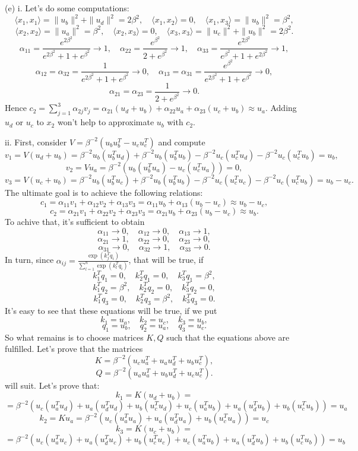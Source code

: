 \documentclass[12pt]{article}
\begin{document}
\noindent (e) i. Let's do some computations:
$$
\langle x_1, x_1\rangle = \|u_b\|^2 + \|u_d\|^2 = 2\beta^2, \quad
\langle x_1, x_2\rangle = 0, \quad
\langle x_1, x_3\rangle = \|u_b\|^2 = \beta^2,
$$
$$
\langle x_2, x_2\rangle = \|u_a\|^2 = \beta^2, \quad
\langle x_2, x_3\rangle = 0, \quad
\langle x_3, x_3\rangle = \|u_c\|^2 + \|u_b\|^2 = 2\beta^2.
$$
$$
\alpha_{11} = \frac{e^{2\beta^2}}{e^{2\beta^2} + 1 + e^{\beta^2}} \to 1,\quad
\alpha_{22} = \frac{e^{\beta^2}}{2 + e^{\beta^2}} \to 1, \quad
\alpha_{33} = \frac{e^{2\beta^2}}{e^{\beta^2} + 1 + e^{2\beta^2}} \to 1,
$$
$$
\alpha_{12} = \alpha_{32} = \frac{1}{e^{2\beta^2} + 1 + e^{\beta^2}}\to 0,\quad
\alpha_{13} = \alpha_{31} = \frac{e^{\beta^2}}{e^{2\beta^2} + 1 + e^{\beta^2}}\to 0,
$$
$$
\alpha_{21} = \alpha_{23} = \frac{1}{2 + e^{\beta^2}}\to 0.
$$
Hence $c_2 = \sum_{j=1}^3 \alpha_{2j}v_j = \alpha_{21}(u_d + u_b) + \alpha_{22} u_a + \alpha_{23}(u_c + u_b) \approx u_a$. Adding $u_d$ or $u_c$ to $x_2$ won't help to approximate $u_b$ with $c_2$.

ii. First, consider $V = \beta^{-2}(u_bu_b^T - u_cu_c^T)$ and compute
$$
v_1 = V(u_d + u_b) = \beta^{-2}u_b(u_b^Tu_d) + \beta^{-2}u_b(u_b^Tu_b) - \beta^{-2}u_c(u_c^Tu_d) - \beta^{-2}u_c(u_c^Tu_b) = u_b,
$$
$$
v_2 = Vu_a = \beta^{-2}(u_b(u_b^Tu_a) - u_c(u_c^Tu_a)) = 0,
$$
$$
v_3 = V(u_c + u_b) = \beta^{-2}u_b(u_b^Tu_c) + \beta^{-2}u_b(u_b^Tu_b) - \beta^{-2}u_c(u_c^Tu_c) - \beta^{-2}u_c(u_c^Tu_b) = u_b - u_c.
$$
The ultimate goal is to achieve the following relations:
$$
c_1 = \alpha_{11} v_1 + \alpha_{12} v_2 + \alpha_{13} v_3 = \alpha_{11} u_b + \alpha_{13} (u_b-u_c) \approx u_b - u_c,
$$
$$
c_2 = \alpha_{21} v_1 + \alpha_{22} v_2 + \alpha_{23} v_3 = \alpha_{21} u_b + \alpha_{23} (u_b-u_c) \approx u_b.
$$
To achive that, it's sufficient to obtain
$$
\alpha_{11} \to 0, \quad \alpha_{12} \to 0, \quad \alpha_{13} \to 1,
$$
$$
\alpha_{21} \to 1, \quad \alpha_{22} \to 0, \quad \alpha_{23} \to 0,
$$
$$
\alpha_{31} \to 0, \quad \alpha_{32} \to 1, \quad \alpha_{33} \to 0.
$$
In turn, since $\alpha_{ij} = \frac{\exp(k_j^Tq_i)}{\sum_{l=1}^n \exp(k_l^Tq_i)}$, that will be true, if
$$
k_1^Tq_1 = 0, \quad k_2^Tq_1 = 0, \quad k_3^Tq_1 = \beta^2,
$$
$$
k_1^Tq_2 = \beta^2, \quad k_2^Tq_2 = 0, \quad k_3^Tq_2 = 0,
$$
$$
k_1^Tq_3 = 0, \quad k_2^Tq_3 = \beta^2, \quad k_3^Tq_3 = 0.
$$
It's easy to see that these equations will be true, if we put
$$
k_1 = u_a, \quad k_2 = u_c, \quad k_3 = u_b,
$$
$$
q_1 = u_b, \quad q_2 = u_a, \quad q_3 = u_c.
$$
So what remains is to choose matrices $K, Q$ such that the equations above are fulfilled.
Let's prove that the matrices
$$
K = \beta^{-2}(u_cu_a^T + u_au_d^T + u_bu_c^T),
$$
$$
Q = \beta^{-2}(u_a u_a^T + u_bu_d^T + u_cu_c^T).
$$
will suit. Let's prove that:
$$
k_1 = K(u_d + u_b) = 
$$
$$=\beta^{-2}(u_c(u_a^Tu_d) + u_a(u_d^Tu_d) + u_b(u_c^Tu_d) + u_c(u_a^Tu_b) + u_a(u_d^Tu_b) + u_b(u_c^Tu_b)) = u_a
$$
$$
k_2 = K u_a = \beta^{-2}(u_c(u_a^Tu_a) + u_a(u_d^Tu_a) + u_b(u_c^Tu_a)) = u_c
$$
$$
k_3 = K(u_c + u_b) = 
$$
$$=\beta^{-2}(u_c(u_a^Tu_c) + u_a(u_d^Tu_c) + u_b(u_c^Tu_c) + u_c(u_a^Tu_b) + u_a(u_d^Tu_b) + u_b(u_c^Tu_b)) = u_b
$$
\end{document}
